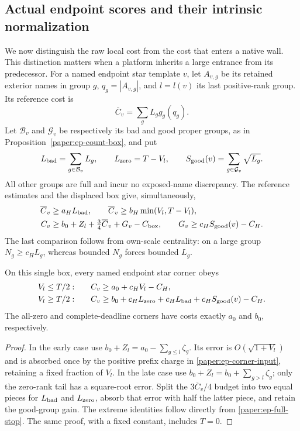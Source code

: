 \subsection{Actual endpoint scores and their intrinsic normalization}
\label{paper:ep-intrinsic-section}
We now distinguish the raw local cost from the cost that enters a native
wall.  This distinction matters when a platform inherits a large
entrance from its predecessor.
For a named endpoint star template $v$, let $A_{v,g}$ be its retained
exterior names in group $g$, $q_g=|A_{v,g}|$, and $l=l(v)$ its last
positive-rank group.  Its reference cost is
\[
 \overline C_v=\sum_gL_gg_g(q_g).
\]
Let $\mathcal B_v$ and $\mathcal G_v$ be respectively its bad and good
proper groups, as in Proposition~\ref{paper:ep-count-box}, and put
\[
 L_{\rm bad}=\sum_{g\in\mathcal B_v}L_g,\qquad
 L_{\rm zero}=T-V_l,\qquad
 S_{\rm good}(v)=\sum_{g\in\mathcal G_v}\sqrt{L_g}.
\]
All other groups are full and incur no exposed-name discrepancy.
The reference estimates and the displaced box give, simultaneously,
\begin{align}
 \overline C_v&\geq a_HL_{\rm bad},\qquad
 \overline C_v\geq b_H\min(V_l,T-V_l),\nonumber\\
 C_v&\geq b_0+Z_l+\tfrac34\overline C_v+G_v-C_{\rm box},
 \qquad G_v\geq c_HS_{\rm good}(v)-C_H.
 \label{paper:ep-corner-input}
\end{align}
The last comparison follows from own-scale centrality: on a large group
$N_g\geq c_HL_g$, whereas bounded $N_g$ forces bounded $L_g$.

\begin{lemma}\label{paper:ep-corner-payment}
On this single box, every named endpoint star corner obeys
\begin{align}
 V_l\leq T/2:&\qquad C_v\geq a_0+c_HV_l-C_H,
                       \label{paper:ep-early-payment}\\
 V_l\geq T/2:&\qquad C_v\geq b_0+c_HL_{\rm zero}
                 +c_HL_{\rm bad}+c_HS_{\rm good}(v)-C_H.
                       \label{paper:ep-late-payment}
\end{align}
The all-zero and complete-deadline corners have costs exactly $a_0$
and $b_0$, respectively.
\end{lemma}
\begin{proof}
In the early case use $b_0+Z_l=a_0-\sum_{g\leq l}\zeta_g$.
Its error is $O(\sqrt{1+V_l})$ and is absorbed once by the positive
prefix charge in \eqref{paper:ep-corner-input}, retaining a fixed
fraction of $V_l$.  In the late case use
$b_0+Z_l=b_0+\sum_{g>l}\zeta_g$; only the zero-rank tail has a
square-root error.  Split the $3\overline C_v/4$ budget into two
equal pieces for $L_{\rm bad}$ and $L_{\rm zero}$, absorb that error
with half the latter piece, and retain the good-group gain.
The extreme identities follow directly from
\eqref{paper:ep-full-stop}.  The same proof, with a fixed constant,
includes $T=0$.
\end{proof}

